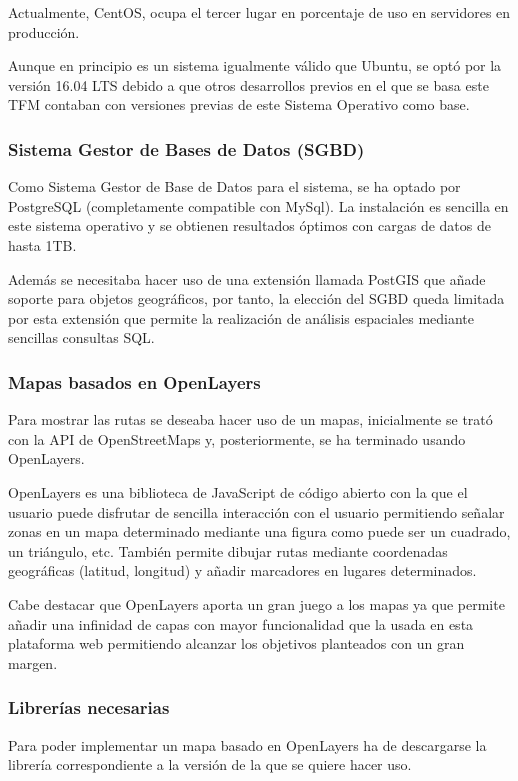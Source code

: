 Actualmente, CentOS, ocupa el tercer lugar en porcentaje de uso en servidores en producción.

Aunque en principio es un sistema igualmente válido que Ubuntu, se optó por la versión 16.04 LTS debido a que otros desarrollos previos en el que se basa este TFM contaban con versiones previas de este Sistema Operativo como base.

\subsubsection{Sistema Gestor de Bases de Datos (SGBD)}

Como Sistema Gestor de Base de Datos para el sistema, se ha optado por PostgreSQL (completamente compatible con MySql). La instalación es sencilla en este sistema operativo y se obtienen resultados óptimos con cargas de datos de hasta 1TB.

Además se necesitaba hacer uso de una extensión llamada PostGIS que añade soporte para objetos geográficos, por tanto, la elección del SGBD queda limitada por esta extensión que permite la realización de análisis espaciales mediante sencillas consultas SQL.

\subsubsection{Mapas basados en OpenLayers}

Para mostrar las rutas se deseaba hacer uso de un mapas, inicialmente se trató con la API de OpenStreetMaps y, posteriormente, se ha terminado usando OpenLayers.

OpenLayers  es una biblioteca de JavaScript de código abierto con la que el usuario puede disfrutar de sencilla interacción con el usuario permitiendo señalar zonas en un mapa determinado mediante una figura como puede ser un cuadrado, un triángulo, etc. También permite dibujar rutas mediante coordenadas geográficas (latitud, longitud) y añadir marcadores en lugares determinados.

Cabe destacar que OpenLayers aporta un gran juego a los mapas ya que permite añadir una infinidad de capas con mayor funcionalidad que la usada en esta plataforma web permitiendo alcanzar los objetivos planteados con un gran margen.

\subsubsection{Librerías necesarias}
Para poder implementar un mapa basado en OpenLayers ha de descargarse la librería correspondiente a la versión de la que se quiere hacer uso.

